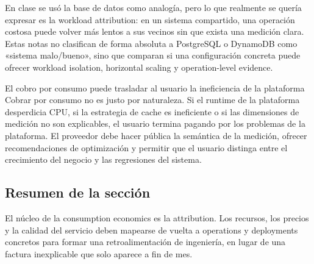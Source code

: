 En clase se usó la base de datos como analogía, pero lo que realmente se quería expresar es la workload attribution: en un sistema compartido, una operación costosa puede volver más lentos a sus vecinos sin que exista una medición clara. Estas notas no clasifican de forma absoluta a PostgreSQL o DynamoDB como «sistema malo/bueno», sino que comparan si una configuración concreta puede ofrecer workload isolation, horizontal scaling y operation-level evidence.


\begin{warningbox}{El cobro por consumo puede trasladar al usuario la ineficiencia de la plataforma}
Cobrar por consumo no es justo por naturaleza. Si el runtime de la plataforma desperdicia CPU, si la estrategia de cache es ineficiente o si las dimensiones de medición no son explicables, el usuario termina pagando por los problemas de la plataforma. El proveedor debe hacer pública la semántica de la medición, ofrecer recomendaciones de optimización y permitir que el usuario distinga entre el crecimiento del negocio y las regresiones del sistema.
\end{warningbox}

\subsection{Resumen de la sección}

El núcleo de la consumption economics es la attribution. Los recursos, los precios y la calidad del servicio deben mapearse de vuelta a operations y deployments concretos para formar una retroalimentación de ingeniería, en lugar de una factura inexplicable que solo aparece a fin de mes.
